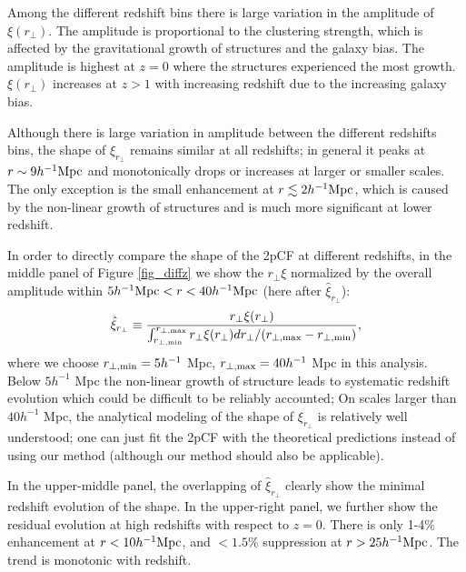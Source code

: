 \documentclass[iop]{emulateapj}
\begin{document}
Among the different redshift bins there is large variation in the amplitude of $\xi(r_\perp)$.
The amplitude is proportional to the clustering strength, which is affected by the gravitational growth of structures and the galaxy bias.
The amplitude is highest at $z=0$ where the structures experienced the most growth.
$\xi(r_\perp)$ increases at $z>1$ with increasing redshift 
due to the increasing galaxy bias.

Although there is large variation in amplitude between the different redshifts bins, 
the shape of $\xi_{r_{\perp}}$  remains similar at all redshifts;
in general it peaks at $r\sim9 h^{-1}\rm Mpc$ and monotonically drops or increases at larger or smaller scales.
The only exception is the small enhancement at $r\lesssim 2 h^{-1}\rm Mpc$,
which is caused by the non-linear growth of structures 
and is much more significant at lower redshift.

In order to directly compare the shape of the 2pCF at different redshifts,
in the middle panel of Figure \ref{fig_diffz} 
we show the $r_\perp\xi$ normalized by the overall amplitude within 
$5h^{-1}{\rm Mpc} < r < 40h^{-1}{\rm Mpc}$
(here after $\hat \xi_{r_\perp}$):
\begin{equation}
 \hat \xi_{ r_\perp} \equiv  \frac{ {r_\perp\xi}(r_{\perp})}{ \int_{r_{\perp, \rm min}}^{r_{\perp, \rm max}}r_{\perp} \xi(r_{\perp}) d r_{\perp} / (r_{\perp,\rm max}-r_{\perp,\rm min}) },
\end{equation}
where we choose $r_{\perp, \rm min}=5 h^{-1}$ Mpc, $r_{\perp, \rm max}=40 h^{-1}$ Mpc in this analysis.
Below $5 h^{-1}$ Mpc the non-linear growth of structure 
leads to systematic redshift evolution which could be difficult to be reliably accounted;
On scales larger than $40 h^{-1}$ Mpc,
the analytical modeling of the shape of $\xi_{r_{\perp}}$ is relatively well understood;
one can just fit the 2pCF with the theoretical predictions \citep{BCGS2001,Salvador2014,Salvador2016} 
instead of using our method 
(although our method should also be applicable).

In the upper-middle panel, the overlapping of $\hat\xi_{r_{\perp}}$
clearly show the minimal redshift evolution of the shape.
In the upper-right panel, 
we further show the residual evolution at high redshifts 
with respect to $z=0$.
There is only 1-4\% enhancement 
at $r<10h^{-1}\rm Mpc$,
and $<1.5\%$ suppression at $r>25 h^{-1}\rm Mpc$.
The trend is monotonic with redshift.
\end{document}
